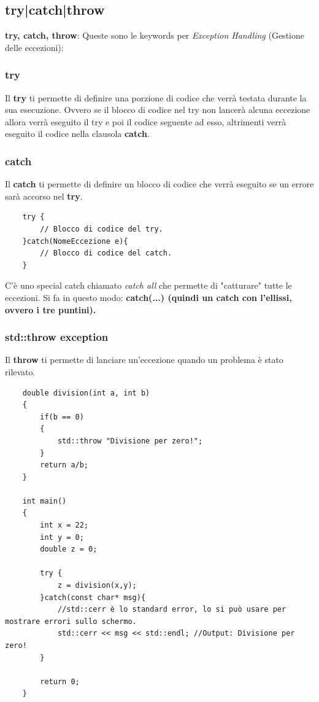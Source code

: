 \subsection{try|catch|throw}

\textsf{\small \textbf{try, catch, throw}: Queste sono le keywords per \emph{Exception Handling} (Gestione delle eccezioni):}

\subsubsection{try}

\textsf{\small Il \textbf{try} ti permette di definire una porzione di codice che verrà testata durante la sua esecuzione. Ovvero se il blocco di codice nel try non lancerà alcuna eccezione allora verrà eseguito il try e poi il codice seguente ad esso, altrimenti verrà eseguito il codice nella clausola \textbf{catch}.} \\

\subsubsection{catch}

\textsf{\small Il \textbf{catch} ti permette di definire un blocco di codice che verrà eseguito se un errore sarà accorso nel \textbf{try}.} \\

\begin{lstlisting}
	try {
		// Blocco di codice del try.
	}catch(NomeEccezione e){
		// Blocco di codice del catch.
	}
\end{lstlisting}

\textsf{\small C'è uno special catch chiamato \emph{catch all} che permette di "catturare" tutte le eccezioni. Si fa in questo modo: \textbf{catch(...) (quindi un catch con l'ellissi, ovvero i tre puntini).}}

\subsubsection{std::throw exception}

\textsf{\small Il \textbf{throw} ti permette di lanciare un'eccezione quando un problema è stato rilevato.} \\

\begin{lstlisting}
	double division(int a, int b)
	{
		if(b == 0)
		{
			std::throw "Divisione per zero!";
		}
		return a/b;
	}

	int main()
	{
		int x = 22;
		int y = 0;
		double z = 0;
		
		try {
			z = division(x,y);
		}catch(const char* msg){
			//std::cerr è lo standard error, lo si può usare per mostrare errori sullo schermo.
			std::cerr << msg << std::endl; //Output: Divisione per zero!
		}
	
		return 0;
	}
\end{lstlisting}

